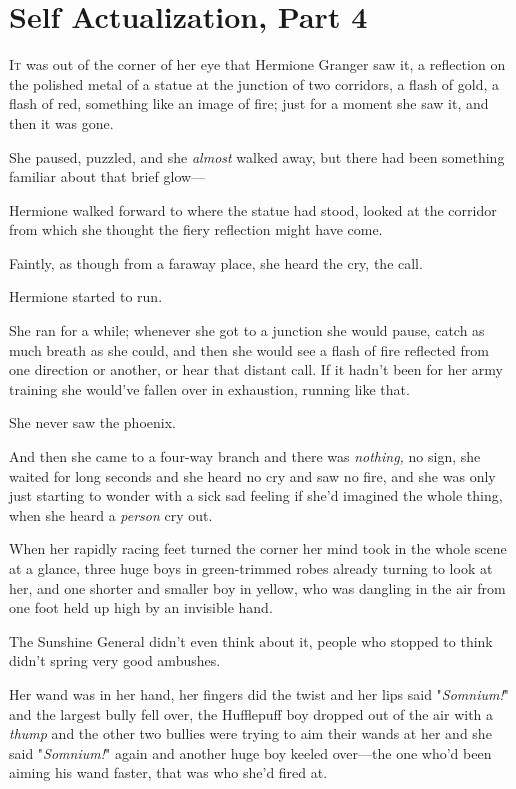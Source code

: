 \chapter{Self Actualization, Part 4}

\lettrine{I}{t} was out of the
corner of her eye that Hermione Granger saw it, a reflection on the polished
metal of a statue at the junction of two corridors, a flash of gold, a flash of
red, something like an image of fire; just for a moment she saw it, and then it
was gone.

She paused, puzzled, and she \emph{almost} walked away, but there had been
something familiar about that brief glow---

Hermione walked forward to where the statue had stood, looked at the corridor
from which she thought the fiery reflection might have come.

Faintly, as though from a faraway place, she heard the cry, the call.

Hermione started to run.

She ran for a while; whenever she got to a junction she would pause, catch as
much breath as she could, and then she would see a flash of fire reflected from
one direction or another, or hear that distant call. If it hadn't been for her
army training she would've fallen over in exhaustion, running like that.

She never saw the phoenix.

And then she came to a four-way branch and there was \emph{nothing,} no sign,
she waited for long seconds and she heard no cry and saw no fire, and she was
only just starting to wonder with a sick sad feeling if she'd imagined the
whole thing, when she heard a \emph{person} cry out.

When her rapidly racing feet turned the corner her mind took in the whole scene
at a glance, three huge boys in green-trimmed robes already turning to look at
her, and one shorter and smaller boy in yellow, who was dangling in the air
from one foot held up high by an invisible hand.

The Sunshine General didn't even think about it, people who stopped to think
didn't spring very good ambushes.

Her wand was in her hand, her fingers did the twist and her lips said
"\emph{Somnium!}" and the largest bully fell over, the Hufflepuff boy dropped
out of the air with a \emph{thump} and the other two bullies were trying to aim
their wands at her and she said "\emph{Somnium!}" again and another huge boy
keeled over---the one who'd been aiming his wand faster, that was who she'd
fired at.

